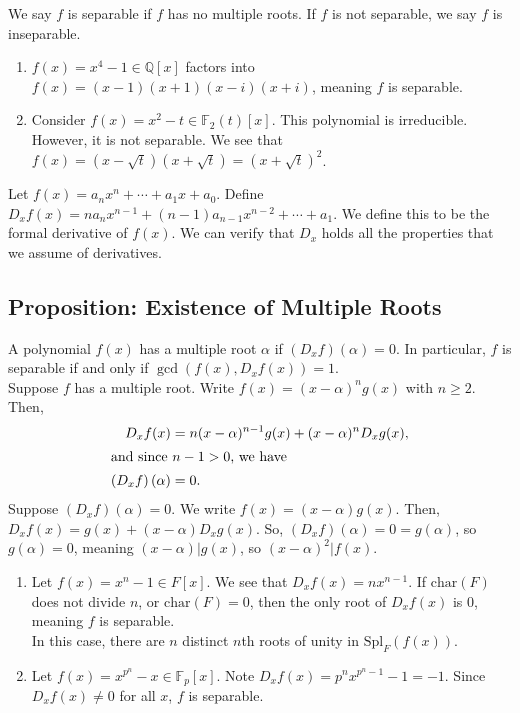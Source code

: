 \documentclass[10pt]{extarticle}
\newcommand{\Q}{\mathbb{Q}}
\begin{document}
  We say $f$ is separable if $f$ has no multiple roots. If $f$ is not separable, we say $f$ is inseparable.
  \begin{enumerate}[(1)]
    \item $f(x) = x^4 - 1\in \Q[x]$ factors into $f(x) = (x-1)(x+1)(x-i)(x+i)$, meaning $f$ is separable.
    \item Consider $f(x) = x^2 - t\in \mathbb{F}_2(t)[x]$. This polynomial is irreducible. However, it is not separable. We see that $f(x) = (x-\sqrt{t})(x+\sqrt{t}) = (x+\sqrt{t})^{2}$.
  \end{enumerate}
  Let $f(x) = a_nx^n + \cdots + a_1x + a_0$. Define $D_xf(x) = na_nx^{n-1}+(n-1)a_{n-1}x^{n-2} + \cdots + a_1$. We define this to be the formal derivative of $f(x)$. We can verify that $D_x$ holds all the properties that we assume of derivatives.
  \subsection{Proposition: Existence of Multiple Roots}%
  A polynomial $f(x)$ has a multiple root $\alpha$ if $(D_xf)(\alpha) = 0$. In particular, $f$ is separable if and only if $\gcd(f(x),D_xf(x)) = 1$.\\

  Suppose $f$ has a multiple root. Write $f(x) = (x-\alpha)^{n}g(x)$ with $n\geq 2$. Then,
  \begin{align*}
    D_xf(x) &= n(x-\alpha)^{n-1}g(x) + (x-\alpha)^{n}D_xg(x),\\
    \intertext{and since $n-1 > 0$, we have}
    \left(D_xf\right)(\alpha) &= 0.
  \end{align*}
  Suppose $\left(D_xf\right)(\alpha) = 0$. We write $f(x) = (x-\alpha)g(x)$. Then, $D_xf(x) = g(x) + (x-\alpha)D_xg(x)$. So, $\left(D_xf\right)(\alpha) = 0 = g(\alpha)$, so $g(\alpha) = 0$, meaning $(x-\alpha)|g(x)$, so $(x-\alpha)^2|f(x)$.
  \begin{enumerate}[(1)]
    \item Let $f(x) = x^n-1\in F[x]$. We see that $D_xf(x) = nx^{n-1}$. If $\text{char}(F)$ does not divide $n$, or $\text{char}(F) = 0$, then the only root of $D_xf(x)$ is $0$, meaning $f$ is separable.\\

      In this case, there are $n$ distinct $n$th roots of unity in $\text{Spl}_F(f(x))$.
    \item Let $f(x) = x^{p^n}-x \in \mathbb{F}_{p}[x]$. Note $D_xf(x) = p^{n}x^{p^n-1}-1 = -1$. Since $D_xf(x)\neq 0$ for all $x$, $f$ is separable.
  \end{enumerate}
\end{document}
